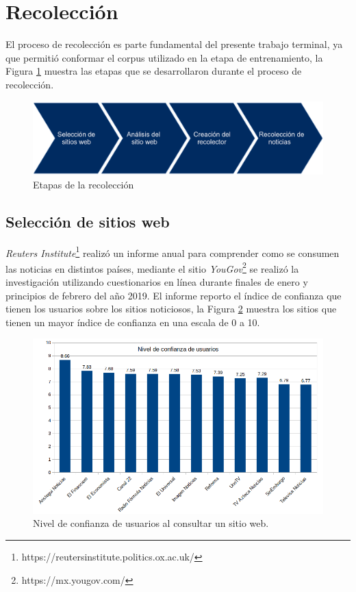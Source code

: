 \section{Recolección}


El proceso de recolección es parte fundamental del presente trabajo terminal, ya que permitió conformar el corpus utilizado en la etapa de entrenamiento, la Figura \ref{fig:etapRecoleccion} muestra las etapas que se desarrollaron durante el proceso de recolección.\\

\begin{figure}[H]
	\centering
	\includegraphics[scale=.30]{imagenes/Capitulo5/etapasRecoleccion.png}
	\caption{Etapas de la recolección}
	\label{fig:etapRecoleccion}
\end{figure}

\subsection{Selección de sitios web}
\textit{Reuters Institute}\footnote{https://reutersinstitute.politics.ox.ac.uk/} realizó un informe anual para comprender como se consumen las noticias en distintos países, mediante el sitio \textit{YouGov}\footnote{https://mx.yougov.com/} se realizó la investigación utilizando cuestionarios en línea durante finales de enero y principios de febrero del año 2019. El informe reporto el índice de confianza que tienen los usuarios sobre los sitios noticiosos, la Figura \ref{fig:nivConfianza} muestra los sitios que tienen un mayor índice de confianza en una escala de 0 a 10.  

\begin{figure}[H]
  \centering
  \includegraphics[scale=.4]{imagenes/Capitulo5/nivelConfianza.png}
  \caption{Nivel de confianza de usuarios al consultar un sitio web.}
  \label{fig:nivConfianza}
\end{figure}

